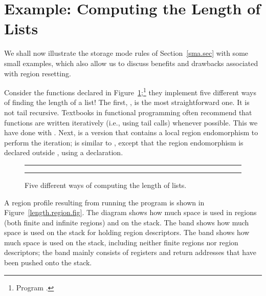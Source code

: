 \documentclass[12pt]{book}
\begin{document}
\section{Example: Computing the Length of Lists}
\label{length.sec}
We shall now illustrate the storage mode rules of Section~\ref{sma.sec} with
some small examples, which also allow us to discuss benefits and drawbacks
associated with region resetting.

Consider the functions declared in Figure~\ref{length.fig};\footnote{Program
.}  they implement five different ways of finding the
length of a list!  The first, , is the most straightforward one.  It
is not tail recursive. Textbooks in functional programming often recommend that
functions are written iteratively (i.e., using tail calls) whenever
possible. This we have done with .  Next,  is a version
that contains a local
%
%
%
region endomorphism  to perform the iteration; 
is similar to , except that the region endomorphism is
declared outside , using
%
%
%
a  declaration.
\begin{figure}
\hrule
\medskip
{}
\caption{Five different ways of computing the length of lists.}
\bigskip
\label{length.fig}
\hrule
\end{figure}
A region profile resulting from running the program is shown in
Figure~\ref{length.region.fig}.  The diagram shows how much space is used in
regions (both finite and infinite regions) and on the stack.  The
%
%
%
 band shows how much space is used on the stack for holding
region descriptors. The
%
%
%
 band shows how much space is used on the stack, including neither
finite regions nor region descriptors; the  band mainly consists of
registers and return addresses that have been pushed onto the stack.
\end{document}
